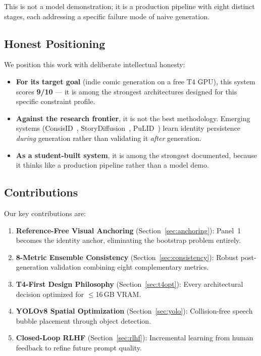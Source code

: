 \documentclass[11pt,a4paper,twocolumn]{article}
\begin{document}
\noindent This is not a model demonstration; it is a production pipeline with eight distinct stages, each addressing a specific failure mode of naive generation.

\subsection{Honest Positioning}

We position this work with deliberate intellectual honesty:

\begin{itemize}[leftmargin=*, nosep]
    \item \textbf{For its target goal} (indie comic generation on a free T4 GPU), this system scores \textbf{9/10} --- it is among the strongest architectures designed for this specific constraint profile.
    \item \textbf{Against the research frontier}, it is not the best methodology. Emerging systems (ConsisID~\cite{consisid2024}, StoryDiffusion~\cite{storydiffusion2024}, PuLID~\cite{pulid2024}) learn identity persistence \textit{during} generation rather than validating it \textit{after} generation.
    \item \textbf{As a student-built system}, it is among the strongest documented, because it thinks like a production pipeline rather than a model demo.
\end{itemize}

\subsection{Contributions}

Our key contributions are:

\begin{enumerate}[leftmargin=*, nosep]
    \item \textbf{Reference-Free Visual Anchoring} (Section~\ref{sec:anchoring}): Panel~1 becomes the identity anchor, eliminating the bootstrap problem entirely.
    \item \textbf{8-Metric Ensemble Consistency} (Section~\ref{sec:consistency}): Robust post-generation validation combining eight complementary metrics.
    \item \textbf{T4-First Design Philosophy} (Section~\ref{sec:t4opt}): Every architectural decision optimized for $\leq$16\,GB VRAM.
    \item \textbf{YOLOv8 Spatial Optimization} (Section~\ref{sec:yolo}): Collision-free speech bubble placement through object detection.
    \item \textbf{Closed-Loop RLHF} (Section~\ref{sec:rlhf}): Incremental learning from human feedback to refine future prompt quality.
\end{enumerate}
\end{document}
